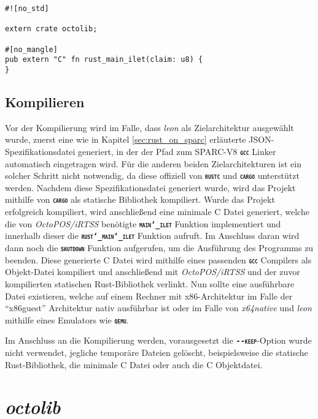 \begin{lstlisting}[float,caption={
Eine minimale Haupt-Quelldatei eines invasiven Cargo-Projekts
},label=code:minimal_cargo_source]
#![no_std]

extern crate octolib;

#[no_mangle]
pub extern "C" fn rust_main_ilet(claim: u8) {
}
\end{lstlisting}

\subsection{Kompilieren}

Vor der Kompilierung wird im Falle, dass \textit{leon} als Zielarchitektur ausgewählt wurde,
zuerst eine wie in Kapitel \ref{sec:rust_on_sparc} erläuterte
JSON-Spezifikationsdatei generiert,
in der der Pfad zum SPARC-V8 \texttt{\textsc{\textbf{gcc}}} Linker automatisch eingetragen wird.
Für die anderen beiden Zielarchitekturen ist ein solcher Schritt nicht notwendig,
da diese offiziell von \texttt{\textsc{\textbf{rustc}}} und \texttt{\textsc{\textbf{cargo}}} unterstützt werden. 
Nachdem diese Spezifikationsdatei generiert wurde, wird das Projekt mithilfe von \texttt{\textsc{\textbf{cargo}}}
als statische Bibliothek kompiliert.
Wurde das Projekt erfolgreich kompiliert, wird anschließend eine minimale C Datei generiert,
welche die von \textit{OctoPOS/iRTSS} benötigte \texttt{\textsc{\textbf{main\char`_ilet}}} Funktion implementiert
und innerhalb dieser die \texttt{\textsc{\textbf{rust\char`_main\char`_ilet}}} Funktion aufruft.
Im Anschluss daran wird dann noch die \texttt{\textsc{\textbf{shutdown}}} Funktion aufgerufen, um die 
Ausführung des Programms zu beenden. Diese generierte C Datei wird mithilfe eines passenden
\texttt{\textsc{\textbf{gcc}}} Compilers als Objekt-Datei kompiliert
und anschließend mit \textit{OctoPOS/iRTSS} und der zuvor kompilierten statischen Rust-Bibliothek verlinkt.
Nun sollte eine ausführbare Datei existieren, welche auf einem Rechner mit x86-Architektur im Falle der "`x86guest"' 
Architektur nativ ausführbar ist oder im Falle von \textit{x64native} und \textit{leon} mithilfe eines Emulators wie 
\texttt{\textsc{\textbf{qemu}}}.

Im Anschluss an die Kompilierung werden,
vorausgesetzt die \texttt{\textsc{\textbf{-{}-keep}}}-Option wurde nicht verwendet,
jegliche temporäre Dateien gelöscht, beispielsweise die statische Rust-Bibliothek,
die minimale C Datei oder auch die C Objektdatei.

\section{\textit{octolib}}\label{sec:octolib}

